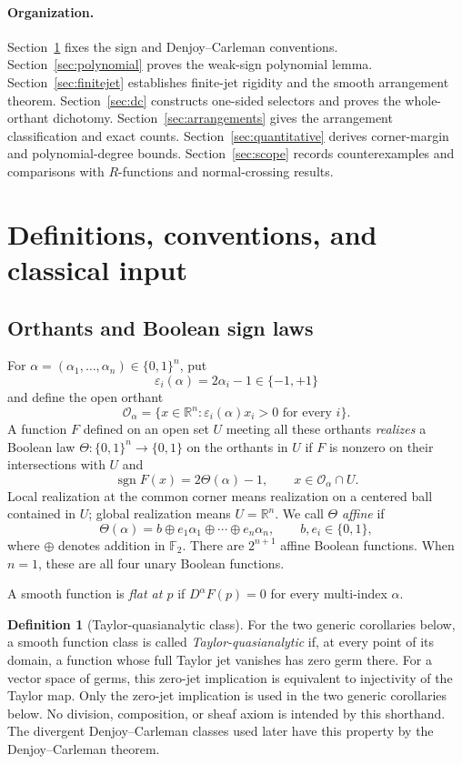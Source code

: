 \documentclass[11pt]{article}
\theoremstyle{definition}
\newtheorem{definition}[theorem]{Definition}
\theoremstyle{remark}
\newcommand{\R}{\mathbb{R}}
\newcommand{\Ftwo}{\mathbb{F}_2}
\newcommand{\bits}{\{0,1\}}
\newcommand{\sign}{\operatorname{sgn}}
\newcommand{\eps}{\varepsilon}
\begin{document}
\paragraph{Organization.}
Section~\ref{sec:setup} fixes the sign and Denjoy--Carleman conventions. Section~\ref{sec:polynomial} proves the weak-sign polynomial lemma. Section~\ref{sec:finitejet} establishes finite-jet rigidity and the smooth arrangement theorem. Section~\ref{sec:dc} constructs one-sided selectors and proves the whole-orthant dichotomy. Section~\ref{sec:arrangements} gives the arrangement classification and exact counts. Section~\ref{sec:quantitative} derives corner-margin and polynomial-degree bounds. Section~\ref{sec:scope} records counterexamples and comparisons with $R$-functions and normal-crossing results.

\section{Definitions, conventions, and classical input}\label{sec:setup}

\subsection{Orthants and Boolean sign laws}

For $\alpha=(\alpha_1,\dots,\alpha_n)\in\bits^n$, put
\[
 \eps_i(\alpha)=2\alpha_i-1\in\{-1,+1\}
\]
and define the open orthant
\[
 \mathcal{O}_\alpha
 =\{x\in\R^n:\eps_i(\alpha)x_i>0\text{ for every }i\}.
\]
A function $F$ defined on an open set $U$ meeting all these orthants \emph{realizes} a Boolean law $\Theta:\bits^n\to\bits$ on the orthants in $U$ if $F$ is nonzero on their intersections with $U$ and
\[
 \sign F(x)=2\Theta(\alpha)-1,
 \qquad x\in\mathcal{O}_\alpha\cap U.
\]
Local realization at the common corner means realization on a centered ball contained in $U$; global realization means $U=\R^n$. We call $\Theta$ \emph{affine} if
\[
 \Theta(\alpha)=b\oplus e_1\alpha_1\oplus\cdots\oplus e_n\alpha_n,
 \qquad b,e_i\in\bits,
\]
where $\oplus$ denotes addition in $\Ftwo$. There are $2^{n+1}$ affine Boolean functions. When $n=1$, these are all four unary Boolean functions.

A smooth function is \emph{flat at $p$} if $D^\alpha F(p)=0$ for every multi-index $\alpha$.

\begin{definition}[Taylor-quasianalytic class]\label{def:taylorquasi}
For the two generic corollaries below, a smooth function class is called \emph{Taylor-quasianalytic} if, at every point of its domain, a function whose full Taylor jet vanishes has zero germ there. For a vector space of germs, this zero-jet implication is equivalent to injectivity of the Taylor map. Only the zero-jet implication is used in the two generic corollaries below. No division, composition, or sheaf axiom is intended by this shorthand. The divergent Denjoy--Carleman classes used later have this property by the Denjoy--Carleman theorem.
\end{definition}
\end{document}
